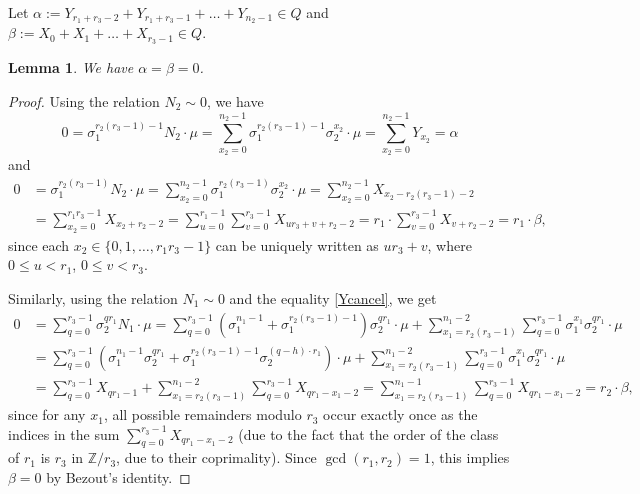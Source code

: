 \documentclass[12pt,a4paper]{article}
\newtheorem{lemma}[theorem]{Lemma}
\theoremstyle{definition}
\newcommand{\Z}{\mathbb{Z}}
\begin{document}
\paragraph*{}
Let $\alpha:= Y_{r_1+r_3-2}+Y_{r_1+r_3-1}+\dots+Y_{n_2-1}\in Q$ and $\beta:=X_0+X_1+\dots+X_{r_3-1}\in Q$.
\begin{lemma}
We have $\alpha=\beta=0$.
\end{lemma}
\begin{proof}
Using the relation $N_2\sim 0$, we have $$0=\sigma_1^{r_2(r_3-1)-1}N_2\cdot \mu =\sum_{x_2=0}^{n_2-1}  \sigma_1^{r_2(r_3-1)-1}\sigma_2^{x_2}\cdot \mu= \sum_{x_2=0}^{n_2-1}Y_{x_2}=\alpha$$ and
\begin{align*}
0&= \sigma_1^{r_2(r_3-1)}N_2\cdot \mu=\sum_{x_2=0}^{n_2-1}  \sigma_1^{r_2(r_3-1)}\sigma_2^{x_2}\cdot \mu=\sum_{x_2=0}^{n_2-1}  X_{x_2-r_2(r_3-1)-2}\\
&=\sum_{x_2=0}^{r_1r_3-1}  X_{x_2+r_2-2}=
\sum_{u=0}^{r_1-1}\sum_{v=0}^{r_3-1} X_{ur_3+v+r_2-2}=r_1\cdot \sum_{v=0}^{r_3-1} X_{v+r_2-2}=r_1\cdot \beta,
\end{align*}
since each $x_2\in\{0,1,\dots,r_1r_3-1\}$ can be uniquely written as $ur_3+v$, where $0\leq u<r_1$, $0\leq v<r_3$.%

Similarly, using the relation $N_1\sim 0$ and the equality \eqref{Ycancel}, %
we get
\begin{align*}
0&= \sum_{q=0}^{r_3-1} \sigma_2^{qr_1}N_1\cdot \mu =\sum_{q=0}^{r_3-1}\left(\sigma_1^{n_1-1}+\sigma_1^{r_2(r_3-1)-1}\right) \sigma_2^{qr_1}\cdot \mu   
+\sum_{x_1=r_2(r_3-1)}^{n_1-2}\sum_{q=0}^{r_3-1} \sigma_1^{x_1}\sigma_2^{qr_1}\cdot \mu\\
&=\sum_{q=0}^{r_3-1}(\sigma_1^{n_1-1}\sigma_2^{qr_1}+\sigma_1^{r_2(r_3-1)-1}\sigma_2^{(q-h)\cdot r_1})\cdot \mu
+\sum_{x_1=r_2(r_3-1)}^{n_1-2}\sum_{q=0}^{r_3-1} \sigma_1^{x_1}\sigma_2^{qr_1}\cdot \mu\\
&=\sum_{q=0}^{r_3-1}X_{qr_1-1}+\sum_{x_1=r_2(r_3-1)}^{n_1-2}\sum_{q=0}^{r_3-1}X_{qr_1-x_1-2}
= \sum_{x_1=r_2(r_3-1)}^{n_1-1}\sum_{q=0}^{r_3-1}X_{qr_1-x_1-2}
=r_2\cdot \beta,
\end{align*}
since for any $x_1$, all possible remainders modulo $r_3$ occur exactly once as the indices in the sum $\sum_{q=0}^{r_3-1}X_{qr_1-x_1-2}$ (due to the fact that the order of the class of $r_1$ is $r_3$ in $\Z/r_3$, due to their coprimality).
Since $\gcd(r_1,r_2)=1$, this implies $\beta=0$ by Bezout's identity.
\end{proof}
\end{document}
